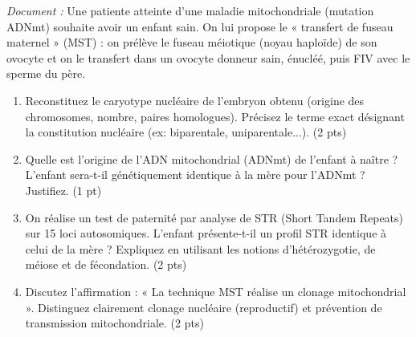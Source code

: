 \documentclass[11pt]{article}
\begin{document}
\begin{exercice}
\emph{Document :} Une patiente atteinte d'une maladie mitochondriale (mutation ADNmt) souhaite avoir un enfant sain. On lui propose le « transfert de fuseau maternel » (MST) : on prélève le fuseau méiotique (noyau haploïde) de son ovocyte et on le transfert dans un ovocyte donneur sain, énucléé, puis FIV avec le sperme du père.

\begin{enumerate}
    \item Reconstituez le caryotype nucléaire de l'embryon obtenu (origine des chromosomes, nombre, paires homologues). Précisez le terme exact désignant la constitution nucléaire (ex: biparentale, uniparentale...). \hfill (2 pts)
    \item Quelle est l'origine de l'ADN mitochondrial (ADNmt) de l'enfant à naître ? L'enfant sera-t-il génétiquement identique à la mère pour l'ADNmt ? Justifiez. \hfill (1 pt)
    \item On réalise un test de paternité par analyse de STR (Short Tandem Repeats) sur 15 loci autosomiques. L'enfant présente-t-il un profil STR identique à celui de la mère ? Expliquez en utilisant les notions d'hétérozygotie, de méiose et de fécondation. \hfill (2 pts)
    \item Discutez l'affirmation : « La technique MST réalise un clonage mitochondrial ». Distinguez clairement clonage nucléaire (reproductif) et prévention de transmission mitochondriale. \hfill (2 pts)
\end{enumerate}
\end{exercice}
\end{document}
